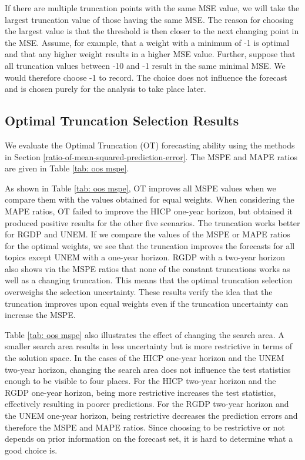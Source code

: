 \documentclass[11pt]{article}
\begin{document}
	If there are multiple truncation points with the same MSE value, we will take the largest truncation value of those having the same MSE. The reason for choosing the largest value is that the threshold is then closer to the next changing point in the MSE. Assume, for example, that a weight with a minimum of -1 is optimal and that any higher weight results in a higher MSE value. Further, suppose that all truncation values between -10 and -1 result in the same minimal MSE. We would therefore choose -1 to record. The choice does not influence the forecast and is chosen purely for the analysis to take place later.
	
	\subsection{Optimal Truncation Selection Results}\label{out-of-sample-truncation-result}
	We evaluate the Optimal Truncation (OT) forecasting ability using the methods in Section \ref{ratio-of-mean-squared-prediction-error}. The MSPE and MAPE ratios are given in Table \ref{tab: oos mspe}.
	
	As shown in Table \ref{tab: oos mspe}, OT improves all MSPE values when we compare them with the values obtained for equal weights. When considering the MAPE ratios, OT failed to improve the HICP one-year horizon, but obtained it produced positive results for the other five scenarios. The truncation works better for RGDP and UNEM. If we compare the values of the MSPE or MAPE ratios for the optimal weights, we see that the truncation improves the forecasts for all topics except UNEM with a one-year horizon. RGDP with a two-year horizon also shows via the MSPE ratios that none of the constant truncations works as well as a changing truncation. This means that the optimal truncation selection overweighs the selection uncertainty. These results verify the idea that the truncation improves upon equal weights even if the truncation uncertainty can increase the MSPE. 
	
	Table \ref{tab: oos mspe} also illustrates the effect of changing the search area. A smaller search area results in less uncertainty but is more restrictive in terms of the solution space. In the cases of the HICP one-year horizon and the  UNEM two-year horizon, changing the search area does not influence the test statistics enough to be visible to four places. For the HICP two-year horizon and the RGDP one-year horizon, being more restrictive increases the test statistics, effectively resulting in poorer predictions. For the RGDP two-year horizon and the UNEM one-year horizon, being restrictive decreases the prediction errors and therefore the MSPE and MAPE ratios. Since choosing to be restrictive or not depends on prior information on the forecast set, it is hard to determine what a good choice is.
	
\end{document}
